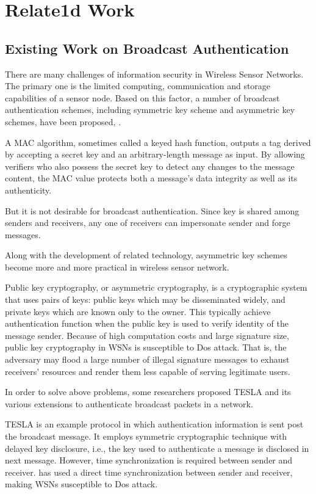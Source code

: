\documentclass{sig-alternate-05-2015}
\begin{document}
\section{Relate1d Work}
\subsection{Existing Work on Broadcast Authentication}
There are many challenges of information security in Wireless Sensor Networks. The primary one is the limited computing, communication and storage capabilities of a sensor node. Based on this factor, a number of broadcast authentication schemes, including symmetric key scheme and asymmetric key schemes, have been proposed, . 

A MAC algorithm, sometimes called a keyed hash function, outputs a tag derived by accepting a secret key and an arbitrary-length message as input\cite{TinySec}. By allowing verifiers who also possess the secret key to detect any changes to the message content, the MAC value protects both a message's data integrity as well as its authenticity.

But it is not desirable for broadcast authentication. Since key is shared among senders and receivers, any one of receivers can impersonate sender and forge messages.

Along with the development of related technology, asymmetric key schemes become more and more practical in wireless sensor network. 

Public key cryptography, or asymmetric cryptography, is a cryptographic system that uses pairs of keys: public keys which may be disseminated widely, and private keys which are known only to the owner. This typically achieve authentication function when the public key is used to verify identity of the message sender. Because of high computation costs and large signature size, public key cryptography in WSNs is susceptible to Dos attack. That is, the adversary may flood a large number of illegal signature messages to exhaust receivers' resources and render them less capable of serving legitimate users. 

In order to solve above problems, some researchers proposed TESLA\cite{Tesla} and its various extensions \cite{multi} to authenticate broadcast packets in a network.

TESLA is an example protocol in which authentication information is sent post the broadcast message. It employs symmetric cryptographic technique with delayed key disclosure, i.e., the key used to authenticate a message is disclosed in next message. However, time synchronization is required between sender and receiver. \cite{Tesla} has used a direct time synchronization between sender and receiver, making WSNs susceptible to Dos attack.
\end{document}
